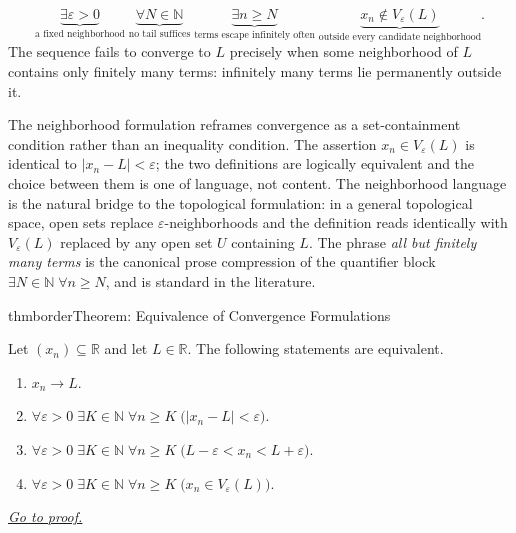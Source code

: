 \begin{remark*}
\[
\underbrace{\exists \varepsilon > 0}_{\text{a fixed neighborhood}}
\;\underbrace{\forall N \in \mathbb{N}}_{\text{no tail suffices}}
\;\underbrace{\exists n \ge N}_{\text{terms escape infinitely often}}
\;\underbrace{x_n \notin V_\varepsilon(L)}_{\text{outside every candidate neighborhood}}.
\]
The sequence fails to converge to $L$ precisely when some neighborhood
of $L$ contains only finitely many terms: infinitely many terms lie
permanently outside it.
\end{remark*}

\begin{remark*}[Interpretation]
The neighborhood formulation reframes convergence as a set-containment
condition rather than an inequality condition. The assertion $x_n \in
V_\varepsilon(L)$ is identical to $|x_n - L| < \varepsilon$; the two
definitions are logically equivalent and the choice between them is one
of language, not content. The neighborhood language is the natural
bridge to the topological formulation: in a general topological space,
open sets replace $\varepsilon$-neighborhoods and the definition reads
identically with $V_\varepsilon(L)$ replaced by any open set $U$
containing $L$. The phrase \emph{all but finitely many terms} is the
canonical prose compression of the quantifier block $\exists N \in
\mathbb{N} \;\forall n \ge N$, and is standard in the literature.
\end{remark*}










\begin{bpnew}{thmborder}{Theorem: Equivalence of Convergence Formulations}
\begin{theorem}
\label{thm:equivalence-of-convergence-formulations}

Let $(x_n) \subseteq \mathbb{R}$ and let $L \in \mathbb{R}$. The following
statements are equivalent.
\begin{enumerate}[label=\textup{(\alph*)}]
    \item $x_n \to L$.
    \item $\forall \varepsilon > 0 \;\exists K \in \mathbb{N} \;\forall n \ge K
          \;\bigl(|x_n - L| < \varepsilon\bigr)$.
    \item $\forall \varepsilon > 0 \;\exists K \in \mathbb{N} \;\forall n \ge K
          \;\bigl(L - \varepsilon < x_n < L + \varepsilon\bigr)$.
    \item $\forall \varepsilon > 0 \;\exists K \in \mathbb{N} \;\forall n \ge K
          \;\bigl(x_n \in V_\varepsilon(L)\bigr)$.
\end{enumerate}

\smallskip
\noindent
\hyperref[prf:equivalence-of-convergence-formulations]{\textit{Go to proof.}}
\end{theorem}
\end{bpnew}


